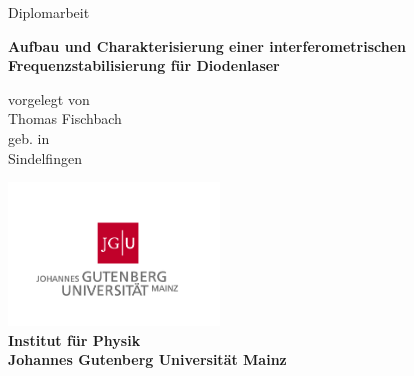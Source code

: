 

\thispagestyle{plain}
\begin{titlepage}
\begin{center}

\vspace*{0.5cm}

\Large{Diplomarbeit}\\

\vspace*{2.2cm}

\fontsize{25pt}{34pt}\selectfont
\bf{Aufbau und Charakterisierung einer interferometrischen Frequenzstabilisierung für Diodenlaser}

\vspace*{1.5cm}
\normalsize{vorgelegt von}\\
\Large{Thomas Fischbach}\\
\normalsize{geb. in}\\
\Large{Sindelfingen}

\vspace*{3.5cm}
\includegraphics[width=0.42\textwidth]{gfx/JGU-Logo}\\
\bf{Institut für Physik}\\
Johannes Gutenberg Universität Mainz\\
\vspace*{1cm}
\normalsize\mdseries{\today}\\

\end{center}
\end{titlepage}

\tableofcontents
\listoffigures
\listoftables



